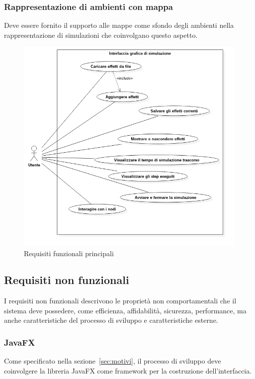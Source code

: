             \subsubsection{Rappresentazione di ambienti con mappa}\label{subsub:mappa}
                Deve essere fornito il supporto alle mappe come sfondo degli ambienti nella rappresentazione di simulazioni che coinvolgano questo aspetto.

                \begin{figure}[htbp]
                    \centering
                    \includegraphics[scale=0.55]{img/useCase}
                    \caption{Requisiti funzionali principali}
                    \label{fig:useCase}
                \end{figure}

        \subsection{Requisiti non funzionali}\label{sub:nonFunzionali}
            I requisiti non funzionali descrivono le proprietà non comportamentali che il sistema deve possedere, come efficienza, affidabilità, sicurezza, performance, ma anche caratteristiche del processo di sviluppo e caratteristiche esterne.

            \subsubsection{JavaFX}\label{subsub:jfx}
                Come specificato nella sezione~\vref{sec:motivi}, il processo di sviluppo deve coinvolgere la libreria JavaFX come framework per la costruzione dell'interfaccia.

